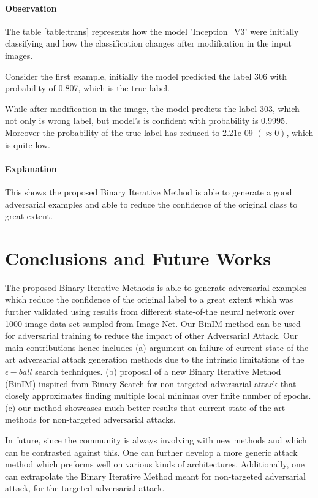 \documentclass[letterpaper]{article} %
\begin{document}
\paragraph{Observation}

The table \ref{table:trans} represents how the model 'Inception\_V3' were initially classifying and how the classification changes after modification in the input images.

Consider the first example, initially the model predicted the label 306 with probability of 0.807, which is the true label. 

While after modification in the image, the model predicts the label 303, which not only is wrong label, but model's is confident with probability is 0.9995. 
Moreover the probability of the true label has reduced to 2.21e-09 $(\approx 0)$, which is quite low. 

\paragraph{Explanation} This shows the proposed Binary Iterative Method is able to generate a good adversarial examples and able to reduce the confidence of the original class to great extent.


\section{Conclusions and Future Works}

The proposed Binary Iterative Methods is able to generate adversarial examples which reduce the confidence of the original label to a great extent which was further validated using results from different state-of-the neural network over 1000 image data set sampled from Image-Net. Our BinIM method can be used for adversarial training to reduce the impact of other Adversarial Attack. Our main contributions hence includes (a) argument on failure of current state-of-the-art adversarial attack generation methods due to the intrinsic limitations of the $ \epsilon -ball $ search techniques. (b) proposal of a new Binary Iterative Method (BinIM) inspired from Binary Search for non-targeted adversarial attack that closely approximates finding multiple local minimas over finite number of epochs. (c) our method showcases much better results that current state-of-the-art methods for non-targeted adversarial attacks.
    
In future, since the community is always involving with new methods and which can be contrasted against this. One can further develop a more generic attack method which preforms well on various kinds of architectures. Additionally, one can extrapolate the Binary Iterative Method meant for non-targeted adversarial attack, for the targeted adversarial attack.



\end{document}

